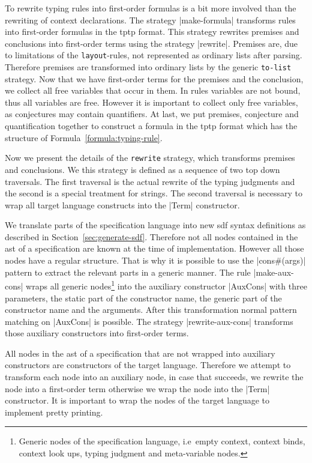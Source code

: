 To rewrite typing rules into first-order formulas is a bit more
involved than the rewriting of context declarations. The strategy
\code|make-formula| transforms rules into first-order formulas in the
\gls{tptp} format. This strategy rewrites premises and conclusions
into first-order terms using the strategy \code|rewrite|. Premises
are, due to limitations of the \texttt{layout}-rules, not represented
as ordinary lists after parsing. Therefore premises are transformed
into ordinary lists by the generic \texttt{to-list} strategy. Now that
we have first-order terms for the premises and the conclusion, we
collect all free variables that occur in them. In rules variables are
not bound, thus all variables are free. However it is important to
collect only free variables, as conjectures may contain
quantifiers. At last, we put premises, conjecture and quantification
together to construct a formula in the \gls{tptp} format which has the
structure of Formula~\ref{formula:typing-rule}.

Now we present the details of the \texttt{rewrite} strategy, which
transforms premises and conclusions. We this strategy is defined as a
sequence of two top down traversals. The first traversal is the actual
rewrite of the typing judgments and the second is a special treatment
for strings. The second traversal is necessary to wrap all target
language constructs into the \code|Term| constructor.

We translate parts of the specification language into new \gls{sdf}
syntax definitions as described in
Section~\ref{sec:generate-sdf}. Therefore not all nodes contained in
the \gls{ast} of a specification are known at the time of
implementation. However all those nodes have a regular structure. That
is why it is possible to use the \code|cons#(args)| pattern to extract
the relevant parts in a generic manner. The rule \code|make-aux-cons|
wraps all generic nodes\footnote{Generic nodes of the specification
  language, i.e\ empty context, context binds, context look ups,
  typing judgment and meta-variable nodes.} into the auxiliary
constructor \code|AuxCons| with three parameters, the static part of
the constructor name, the generic part of the constructor name and the
arguments. After this transformation normal pattern matching on
\code|AuxCons| is possible. The strategy \code|rewrite-aux-cons|
transforms those auxiliary constructors into first-order terms.

All nodes in the \gls{ast} of a specification that are not wrapped
into auxiliary constructors are constructors of the target
language. Therefore we attempt to transform each node into an
auxiliary node, in case that succeeds, we rewrite the node into a
first-order term otherwise we wrap the node into the \code|Term|
constructor. It is important to wrap the nodes of the target language
to implement pretty printing.

